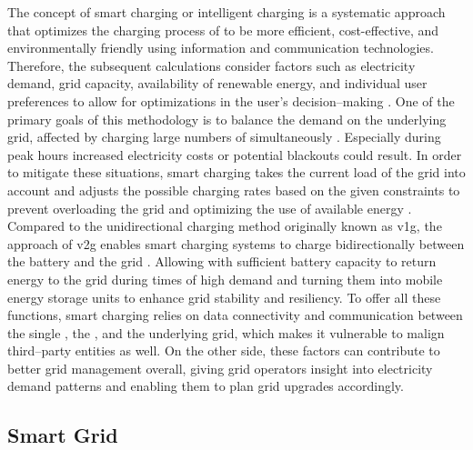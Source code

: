 The concept of smart charging or intelligent charging is a systematic approach that optimizes the charging process of  to be more efficient, cost-effective, and environmentally friendly using information and communication technologies. 
Therefore, the subsequent calculations consider factors such as electricity demand, grid capacity, availability of renewable energy, and individual user preferences to allow for optimizations in the user's decision--making \cite{deb_smart_2022}.
One of the primary goals of this methodology is to balance the demand on the underlying grid, affected by charging large numbers of  simultaneously \cite{daina_electric_2017}. Especially during peak hours increased electricity costs or potential blackouts could result. 
In order to mitigate these situations, smart charging takes the current load of the grid into account and adjusts the possible charging rates based on the given constraints to prevent overloading the grid and optimizing the use of available energy \cite{garcia-villalobos_plug-electric_2014}. 
Compared to the unidirectional charging method originally known as \acrfull{v1g}, the approach of \acrfull{v2g} enables smart charging systems to charge bidirectionally between the  battery and the grid \cite[199]{kathiresh_e-mobility_2022}. Allowing  with sufficient battery capacity to return energy to the grid during times of high demand and turning them into mobile energy storage units to enhance grid stability and resiliency.
To offer all these functions, smart charging relies on data connectivity and communication between the single , the , and the underlying grid, which makes it vulnerable to malign third--party entities as well. On the other side, these factors can contribute to better grid management overall, giving grid operators insight into electricity demand patterns and enabling them to plan grid upgrades accordingly.

\subsection{Smart Grid}
\label{ch:Fundamentals:sec:Electric Mobility:ssec:Smart Grid}

